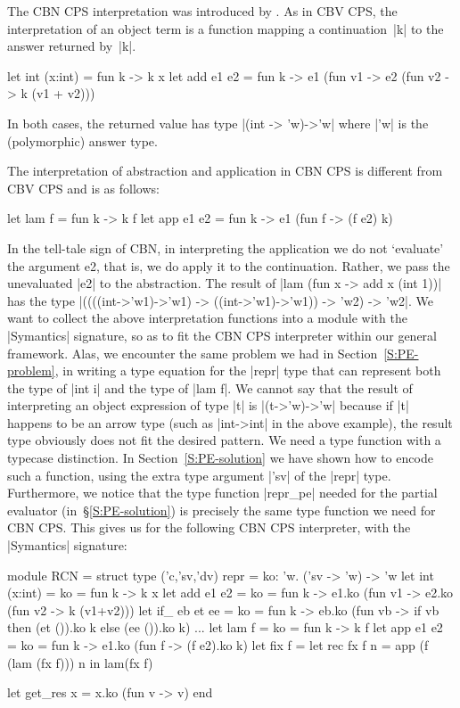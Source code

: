 \documentclass[preprint]{sigplanconf}
\begin{document}
The CBN CPS interpretation was introduced by \citet{PlotkinCBN}. As in
CBV CPS, the interpretation of an object term is a function
mapping a continuation~|k| to the answer
returned by~|k|.
\begin{code}
let int (x:int) = fun k -> k x
let add e1 e2 = fun k ->
  e1 (fun v1 -> e2 (fun v2 -> k (v1 + v2)))
\end{code}
In both cases, the returned value has type 
|(int -> 'w)->'w| where |'w| is the (polymorphic) answer type.

The interpretation of abstraction and application in CBN CPS is
different from CBV CPS and is as follows:
\begin{code}
let lam f = fun k -> k f
let app e1 e2 = fun k -> e1 (fun f -> (f e2) k)
\end{code}
In the tell-tale sign of CBN, in interpreting the application
we do not `evaluate' the argument e2, that is, we do apply it to the
continuation. Rather, we pass the unevaluated |e2| to the abstraction.
The result of |lam (fun x -> add x (int 1))| has the type
|((((int->'w1)->'w1) -> ((int->'w1)->'w1)) -> 'w2) -> 'w2|.
We want to collect the above interpretation functions into a module
with the |Symantics| signature, so as to fit the CBN CPS interpreter within our
general framework. Alas, we encounter the same problem we had in
Section~\ref{S:PE-problem}, in writing a type equation for the |repr|
type that can represent both the type of |int i| and the type of 
|lam f|. We cannot say that the result of interpreting an object
expression of type |t| is |(t->'w)->'w| because if |t| happens to
be an arrow type (such as |int->int| in the above example), the result
type obviously does not fit the desired pattern. We need a type
function with a typecase distinction. In Section~\ref{S:PE-solution} we have
shown how to encode such a function, using the extra type
argument |'sv| of the |repr| type. Furthermore, we notice that the type 
function |repr_pe| needed for the partial evaluator 
(in~\S\ref{S:PE-solution}) is precisely the same type function we
need for CBN CPS. This gives us for the following CBN CPS interpreter,
with the |Symantics| signature:

\begin{code}
module RCN = struct
  type ('c,'sv,'dv) repr = 
     {ko: 'w. ('sv -> 'w) -> 'w}
  let int (x:int) = {ko = fun k -> k x}
  let add e1 e2 = 
    {ko = fun k -> e1.ko (fun v1 -> 
                   e2.ko (fun v2 -> k (v1+v2)))}
  let if_ eb et ee = 
    {ko = fun k -> eb.ko 
         (fun vb -> if vb then (et ()).ko k 
                    else (ee ()).ko k)}
  ...
  let lam f = {ko = fun k -> k f}
  let app e1 e2 = 
     {ko = fun k -> e1.ko (fun f -> (f e2).ko k)}
  let fix f = 
     let rec fx f n = app (f (lam (fx f))) n in 
     lam(fx f)

  let get_res x = x.ko (fun v -> v)
end
\end{code}
\end{document}
